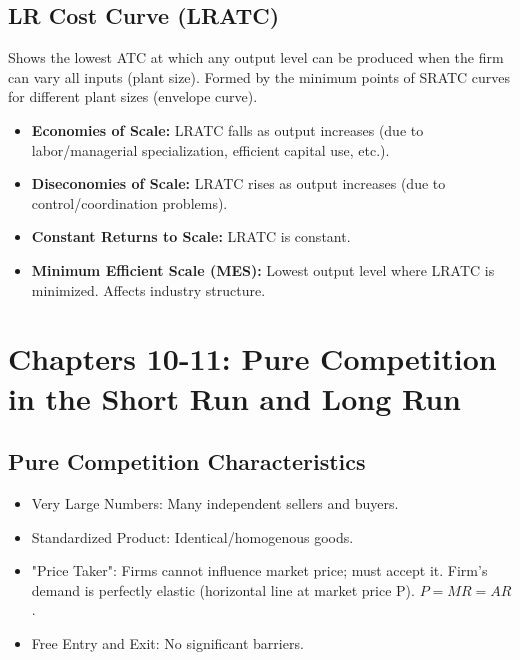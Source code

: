 \documentclass{article}
\begin{document}
\subsection*{LR Cost Curve (LRATC)}
Shows the lowest ATC at which any output level can be produced when the firm can vary all inputs (plant size). Formed by the minimum points of SRATC curves for different plant sizes (envelope curve).
\begin{itemize}
    \item \textbf{Economies of Scale:} LRATC falls as output increases (due to labor/managerial specialization, efficient capital use, etc.).
    \item \textbf{Diseconomies of Scale:} LRATC rises as output increases (due to control/coordination problems).
    \item \textbf{Constant Returns to Scale:} LRATC is constant.
    \item \textbf{Minimum Efficient Scale (MES):} Lowest output level where LRATC is minimized. Affects industry structure.
\end{itemize}

\section*{Chapters 10-11: Pure Competition in the Short Run and Long Run}

\subsection*{Pure Competition Characteristics}
\begin{itemize}
    \item Very Large Numbers: Many independent sellers and buyers.
    \item Standardized Product: Identical/homogenous goods.
    \item "Price Taker": Firms cannot influence market price; must accept it. Firm's demand is perfectly elastic (horizontal line at market price P). $P = MR = AR$.
    \item Free Entry and Exit: No significant barriers.
\end{itemize}
\end{document}
